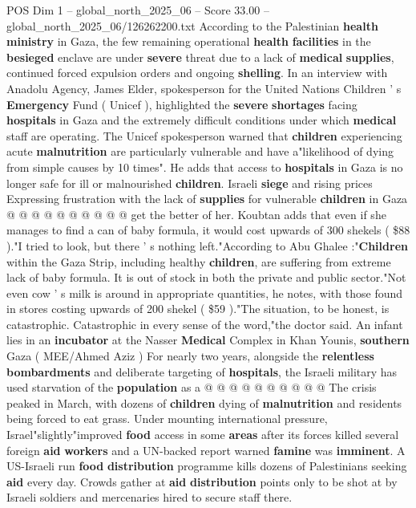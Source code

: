 \begin{textsample}{POS Dim 1 – global\_north\_2025\_06 – Score 33.00 – global\_north\_2025\_06/126262200.txt}
According to the Palestinian \textbf{health} \textbf{ministry} in Gaza, the few remaining operational \textbf{health} \textbf{facilities} in the \textbf{besieged} enclave are under \textbf{severe} threat due to a lack of \textbf{medical} \textbf{supplies}, continued forced expulsion orders and ongoing \textbf{shelling}.
In an interview with Anadolu Agency, James Elder, spokesperson for the United Nations Children ' s \textbf{Emergency} Fund ( Unicef ), highlighted the \textbf{severe} \textbf{shortages} facing \textbf{hospitals} in Gaza and the extremely difficult conditions under which \textbf{medical} staff are operating.
The Unicef spokesperson warned that \textbf{children} experiencing acute \textbf{malnutrition} are particularly vulnerable and have a"likelihood of dying from simple causes by 10 times".
He adds that access to \textbf{hospitals} in Gaza is no longer safe for ill or malnourished \textbf{children}.
Israeli \textbf{siege} and rising prices Expressing frustration with the lack of \textbf{supplies} for vulnerable \textbf{children} in Gaza @ @ @ @ @ @ @ @ @ @ get the better of her.
Koubtan adds that even if she manages to find a can of baby formula, it would cost upwards of 300 shekels ( \$88 )."I tried to look, but there ' s nothing left."According to Abu Ghalee :"\textbf{Children} within the Gaza Strip, including healthy \textbf{children}, are suffering from extreme lack of baby formula.
It is out of stock in both the private and public sector."Not even cow ' s milk is around in appropriate quantities, he notes, with those found in stores costing upwards of 200 shekel ( \$59 )."The situation, to be honest, is catastrophic.
Catastrophic in every sense of the word,"the doctor said.
An infant lies in an \textbf{incubator} at the Nasser \textbf{Medical} Complex in Khan Younis, \textbf{southern} Gaza ( MEE/Ahmed Aziz ) For nearly two years, alongside the \textbf{relentless} \textbf{bombardments} and deliberate targeting of \textbf{hospitals}, the Israeli military has used starvation of the \textbf{population} as a @ @ @ @ @ @ @ @ @ @ The crisis peaked in March, with dozens of \textbf{children} dying of \textbf{malnutrition} and residents being forced to eat grass.
Under mounting international pressure, Israel"slightly"improved \textbf{food} access in some \textbf{areas} after its forces killed several foreign \textbf{aid} \textbf{workers} and a UN-backed report warned \textbf{famine} was \textbf{imminent}.
A US-Israeli run \textbf{food} \textbf{distribution} programme kills dozens of Palestinians seeking \textbf{aid} every day.
Crowds gather at \textbf{aid} \textbf{distribution} points only to be shot at by Israeli soldiers and mercenaries hired to secure staff there.

\end{textsample}
